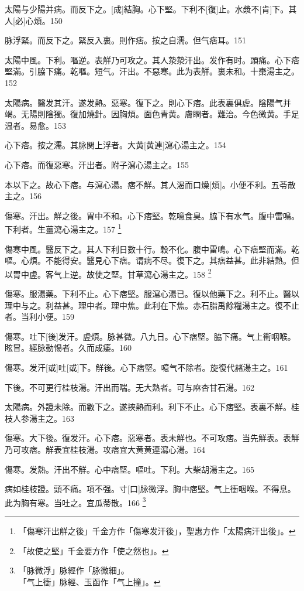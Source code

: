 \documentclass[12pt,twoside,UTF8,b5paper]{ctexbook}
\begin{document}
太陽与少陽并病。而反下之。[成]結胸。心下堅。下利不[復]止。水漿不[肯]下。其人[必]心煩。150

脉浮緊。而反下之。緊反入裏。則作痞。按之自濡。但气痞耳。151

太陽中風。下利。嘔逆。表觧乃可攻之。其人漐漐汗出。发作有时。頭痛。心下痞堅滿。引脇下痛。乾嘔。短气。汗出。不惡寒。此为表觧。裏未和。十棗湯主之。152

太陽病。醫发其汗。遂发熱。惡寒。復下之。則心下痞。此表裏俱虗。陰陽气并竭。无陽則陰獨。復加燒針。因胸煩。面色青黄。膚瞤者。難治。今色微黄。手足温者。易愈。153

心下痞。按之濡。其脉関上浮者。大黄[黄連]瀉心湯主之。154

心下痞。而復惡寒。汗出者。附子瀉心湯主之。155

本以下之。故心下痞。与瀉心湯。痞不觧。其人渴而口燥[煩]。小便不利。五苓散主之。156

傷寒。汗出。觧之後。胃中不和。心下痞堅。乾噫食臭。脇下有水气。腹中雷鳴。下利者。生薑瀉心湯主之。157
	\footnote{「傷寒汗出觧之後」千金方作「傷寒发汗後」，聖惠方作「太陽病汗出後」。}

傷寒中風。醫反下之。其人下利日數十行。穀不化。腹中雷鳴。心下痞堅而滿。乾嘔。心煩。不能得安。醫見心下痞。谓病不尽。復下之。其痞益甚。此非結熱。但以胃中虗。客气上逆。故使之堅。甘草瀉心湯主之。158
	\footnote{「故使之堅」千金要方作「使之然也」。}

傷寒。服湯藥。下利不止。心下痞堅。服瀉心湯已。復以他藥下之。利不止。醫以理中与之。利益甚。理中者。理中焦。此利在下焦。赤石脂禹餘糧湯主之。復不止者。当利小便。159

傷寒。吐下[後]发汗。虗煩。脉甚微。八九日。心下痞堅。脇下痛。气上衝咽喉。眩冒。經脉動愓者。久而成痿。160

傷寒。发汗[或]吐[或]下。觧後。心下痞堅。噫气不除者。旋復代赭湯主之。161

下後。不可更行桂枝湯。汗出而喘。无大熱者。可与麻杏甘石湯。162

太陽病。外證未除。而數下之。遂挾熱而利。利下不止。心下痞堅。表裏不觧。桂枝人参湯主之。163

傷寒。大下後。復发汗。心下痞。惡寒者。表未觧也。不可攻痞。当先觧表。表觧乃可攻痞。觧表宜桂枝湯。攻痞宜大黄黄連瀉心湯。164

傷寒。发熱。汗出不觧。心中痞堅。嘔吐。下利。大柴胡湯主之。165

病如桂枝證。頭不痛。項不强。寸[口]脉微浮。胸中痞堅。气上衝咽喉。不得息。此为胸有寒。当吐之。宜瓜蒂散。166
	\footnote{「脉微浮」脉經作「脉微細」。\\「气上衝」脉經、玉函作「气上撞」。}
\end{document}
